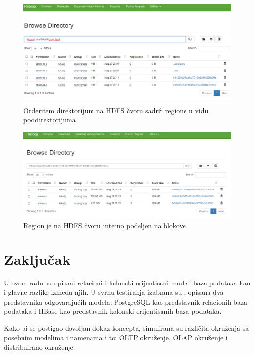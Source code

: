 \documentclass[12pt,oneside]{memoir}
\begin{document}
\begin{figure}[!ht]
  \centering
  \includegraphics[width=1\textwidth]{orderitem-datanode.png}
  \caption{Orderitem direktorijum na HDFS čvoru sadrži regione u vidu poddirektorijuma}
  \label{fig:grafikon}
\end{figure}

\begin{figure}[!ht]
  \centering
  \includegraphics[width=1\textwidth]{orderitem-datanode-regions-blocks.png}
  \caption{Region je na HDFS čvoru interno podeljen na blokove}
  \label{fig:grafikon}
\end{figure}




\chapter{Zaključak}

U ovom radu su opisani relacioni i kolonski orijentisani modeli baza podataka kao i glavne razlike između njih. U svrhu testiranja izabrana su i opisana dva predstavnika odgovarajućih modela: PostgreSQL kao predstavnik relacionih baza podataka i HBase kao predstavnik kolonski orijentisanih baza podataka.

Kako bi se postigao dovoljan dokaz koncepta, simulirana su različita okruženja sa posebnim modelima i namenama i to: OLTP okruženje, OLAP okruženje i distribuirano okruženje.
\end{document}

